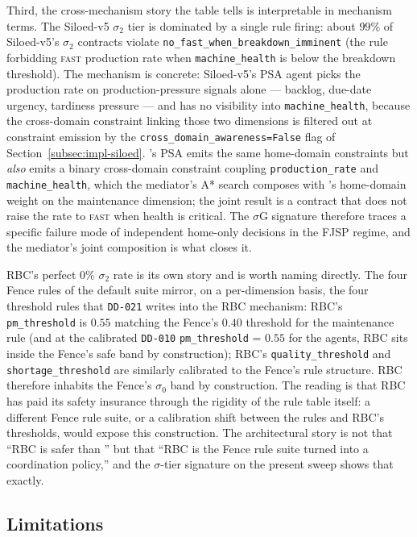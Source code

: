 Third, the cross-mechanism story the table tells is interpretable in
mechanism terms. The Siloed-v5 $\sigma_2$ tier is dominated by a
single rule firing: about $99\%$ of Siloed-v5's $\sigma_2$ contracts
violate \texttt{no\_fast\_when\_breakdown\_imminent} (the rule
forbidding \textsc{fast} production rate when
\texttt{machine\_health} is below the breakdown threshold). The
mechanism is concrete: Siloed-v5's PSA agent picks the production
rate on production-pressure signals alone --- backlog, due-date
urgency, tardiness pressure --- and has no visibility into
\texttt{machine\_health}, because the cross-domain constraint
linking those two dimensions is filtered out at constraint emission
by the \texttt{cross\_domain\_awareness=False} flag of
Section~\ref{subsec:impl-siloed}. \NEXUS{}'s PSA emits the same
home-domain constraints but \emph{also} emits a binary cross-domain
constraint coupling \texttt{production\_rate} and
\texttt{machine\_health}, which the mediator's A* search composes
with \PMA{}'s home-domain weight on the maintenance dimension; the
joint result is a contract that does not raise the rate to
\textsc{fast} when health is critical. The $\sigma$G signature
therefore traces a specific failure mode of independent home-only
decisions in the FJSP regime, and the mediator's joint composition
is what closes it.

RBC's perfect $0\%$ $\sigma_2$ rate is its own story and is worth
naming directly. The four Fence rules of the default suite mirror,
on a per-dimension basis, the four threshold rules that
\texttt{DD-021} writes into the RBC mechanism: RBC's
\texttt{pm\_threshold} is $0.55$ matching the Fence's $0.40$
threshold for the maintenance rule (and at the calibrated
\texttt{DD-010} \texttt{pm\_threshold} = $0.55$ for the agents, RBC
sits inside the Fence's safe band by construction); RBC's
\texttt{quality\_threshold} and \texttt{shortage\_threshold} are
similarly calibrated to the Fence's rule structure. RBC therefore
inhabits the Fence's $\sigma_0$ band by construction. The reading is
that RBC has paid its safety insurance through the rigidity of the
rule table itself: a different Fence rule suite, or a calibration
shift between the rules and RBC's thresholds, would expose this
construction. The architectural story is not that ``RBC is safer
than \NEXUS{}'' but that ``RBC is the Fence rule suite turned into a
coordination policy,'' and the $\sigma$-tier signature on the
present sweep shows that exactly.

\subsection*{Limitations}

